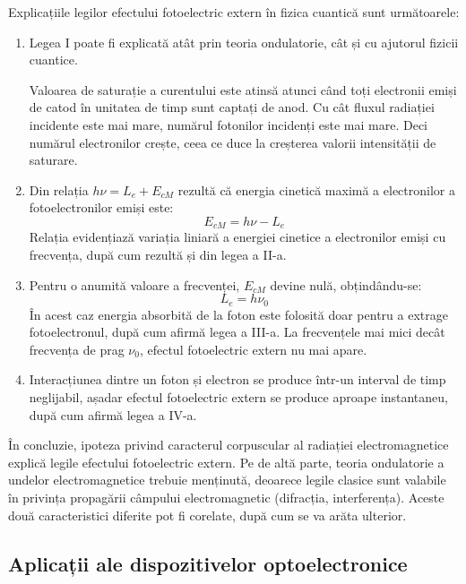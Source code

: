 Explicațiile legilor efectului fotoelectric extern în fizica cuantică sunt
următoarele:
\begin{enumerate}
    \renewcommand{\labelenumi}{\textbf{\Roman{enumi}.}}
    \item Legea I poate fi explicată atât prin teoria ondulatorie, cât și cu ajutorul
        fizicii cuantice.

        Valoarea de saturație a curentului este atinsă atunci când toți
        electronii emiși de catod în unitatea de timp sunt captați de anod. Cu
        cât fluxul radiației incidente este mai mare, numărul fotonilor
        incidenți este mai mare.  Deci numărul electronilor crește, ceea ce
        duce la creșterea valorii intensității de saturare.

    \item Din relația \( h\nu = L_e + E_{cM} \) rezultă că energia cinetică maximă
        a electronilor a fotoelectronilor emiși este:
        \[ E_{cM} = h\nu - L_e \]
        Relația evidențiază variația liniară a energiei cinetice a electronilor emiși
        cu frecvența, după cum rezultă și din legea a II-a.
    \item Pentru o anumită valoare a frecvenței, $E_{cM}$ devine nulă, obțindându-se:
        \[ L_e = h\nu_0 \]
        În acest caz energia absorbită de la foton este folosită doar pentru a extrage
        fotoelectronul, după cum afirmă legea a III-a. La frecvențele mai mici decât
        frecvența de prag $\nu_0$, efectul fotoelectric extern nu mai apare.
    \item Interacțiunea dintre un foton și electron se produce într-un interval
        de timp neglijabil, așadar efectul fotoelectric extern se produce aproape
        instantaneu, după cum afirmă legea a IV-a.
\end{enumerate}

\parbreak

În concluzie, ipoteza privind caracterul corpuscular al radiației electromagnetice
explică legile efectului fotoelectric extern. Pe de altă parte, teoria ondulatorie a
undelor electromagnetice trebuie menținută, deoarece legile clasice sunt valabile în
privința propagării câmpului electromagnetic (difracția, interferența). Aceste două
caracteristici diferite pot fi corelate, după cum se va arăta ulterior.

\subsection{Aplicații ale dispozitivelor optoelectronice}

